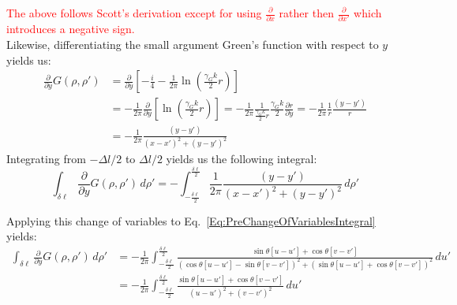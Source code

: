 \documentclass{article}
\newcommand{\tjs}[1]{\textcolor{red}{#1}}
\newcommand{\0}{\varnothing}
\begin{document}
\tjs{The above follows Scott's derivation except for using $\frac{\partial}{\partial x}$ rather then $\frac{\partial}{\partial x'}$ which introduces a negative sign.}
\ \\

Likewise, differentiating the small argument Green's function with respect to $y$ yields us:
\begin{align*}
    \frac{\partial}{\partial y} G(\rho, \rho') &= \frac{\partial}{\partial y} \left[ -\frac{i}{4} - \frac{1}{2\pi}\ln\left(\frac{\gamma_G k}{2} r \right) \right]\\
    &= - \frac{1}{2\pi}\frac{\partial}{\partial y} \left[\ln\left(\frac{\gamma_G k}{2} r \right) \right] = - \frac{1}{2\pi}\frac{1}{\frac{\gamma_G k}{2} r} \frac{\gamma_G k}{2} \frac{\partial r}{\partial y} = - \frac{1}{2\pi}\frac{1}{r}  \frac{(y-y')}{r} \\
    &=-\frac{1}{2\pi} \frac{(y-y')}{(x-x')^2+(y-y')^2}
\end{align*}
Integrating from $-\Delta l/2$ to $\Delta l/2$ yields us the following integral:
\begin{equation}\label{Eq:PreChangeOfVariablesIntegralY}
    \int_{\delta\ell}\frac{\partial}{\partial y}G(\rho,\rho')\, d\rho' = - \int_{-\frac{\delta \ell}{2}}^{\frac{\delta \ell}{2}} \frac{1}{2\pi} \frac{(y-y')}{(x-x')^2+(y-y')^2}\, d\rho'
\end{equation}

Applying this change of variables to Eq.~\eqref{Eq:PreChangeOfVariablesIntegral} yields:
\begin{align*}
    \int_{\delta\ell}\frac{\partial}{\partial y}G(\rho,\rho')\, d\rho' &= -\frac{1}{2\pi}\int_{-\frac{\delta \ell}{2}}^{\frac{\delta \ell}{2}}\frac{\sin{\theta}[u-u'] + \cos{\theta}[v-v']}
    {(\cos{\theta}[u-u'] - \sin{\theta}[v-v'])^2 + (\sin{\theta}[u-u'] + \cos{\theta}[v-v'])^2}\,du' \\
    &= -\frac{1}{2\pi}\int_{-\frac{\delta \ell}{2}}^{\frac{\delta \ell}{2}}\frac{\sin{\theta}[u-u'] + \cos{\theta}[v-v']}{(u-u')^2 + (v-v')^2}\,du'
\end{align*}
\end{document}
